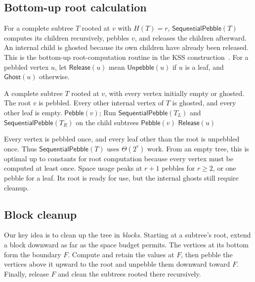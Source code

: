 \documentclass[11pt]{article}
\theoremstyle{definition}
\theoremstyle{remark}
\newcommand{\Peb}{\mathsf{Pebble}}
\newcommand{\Unp}{\mathsf{Unpebble}}
\newcommand{\Ghost}{\mathsf{Ghost}}
\newcommand{\Fast}{\mathsf{SequentialPebble}}
\newcommand{\Release}{\mathsf{Release}}
\begin{document}
\subsection{Bottom-up root calculation}
\label{sec:fast-root}

For a complete subtree $T$ rooted at $v$ with $H(T)=r$, $\Fast(T)$ computes its children recursively, pebbles $v$, and releases the children afterward. An internal child is ghosted because its own children have already been released. This is the bottom-up root-computation routine in the KSS construction~\cite[Theorem~5.5]{KSS2025}. For a pebbled vertex $u$, let $\Release(u)$ mean $\Unp(u)$ if $u$ is a leaf, and $\Ghost(u)$ otherwise.

\begin{algorithm}[H]
\caption{Bottom-up root computation $\Fast(T)$}
\label{alg:fast-root}
\begin{algorithmic}[1]
\Require A complete subtree $T$ rooted at $v$, with every vertex initially empty or ghosted.
\Ensure The root $v$ is pebbled. Every other internal vertex of $T$ is ghosted, and every other leaf is empty.
 \State $\Peb(v)$; \Return
\EndIf
\State Run $\Fast(T_L)$ and $\Fast(T_R)$ on the child subtrees
\State $\Peb(v)$
\State $\Release(u)$
\EndFor
\end{algorithmic}
\end{algorithm}

Every vertex is pebbled once, and every leaf other than the root is unpebbled once. Thus $\Fast(T)$ uses $\Theta(2^r)$ work. From an empty tree, this is optimal up to constants for root computation because every vertex must be computed at least once. Space usage peaks at $r+1$ pebbles for $r\ge2$, or one pebble for a leaf. Its root is ready for use, but the internal ghosts still require cleanup.

\subsection{Block cleanup}
\label{sec:block-cleanup}

Our key idea is to clean up the tree in \emph{blocks}. Starting at a subtree's root, extend a block downward as far as the space budget permits. The vertices at its bottom form the boundary $F$. Compute and retain the values at $F$, then pebble the vertices above it upward to the root and unpebble them downward toward $F$. Finally, release $F$ and clean the subtrees rooted there recursively.
\end{document}
